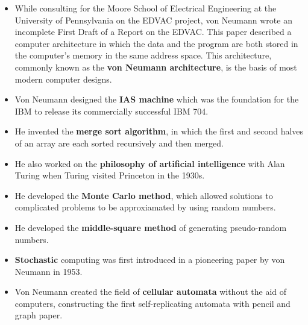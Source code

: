 \documentclass [12pt, a4paper]{article}
\begin{document}
\begin{itemize}

	\item While consulting for the Moore School of Electrical Engineering at the University of Pennsylvania on the EDVAC project, von Neumann wrote an incomplete First Draft of a Report on the EDVAC. This paper described a computer architecture in which the data and the program are both stored in the computer's memory in the same address space. This architecture, commonly known as the \textbf{von Neumann architecture}, is the basis of most modern computer designs.
	\item Von Neumann designed the \textbf{IAS machine} which was the foundation for the IBM to release its commercially successful IBM 704.
	\item He invented the \textbf{merge sort algorithm}, in which the first and second halves of an array are each sorted recursively and then merged.
	\item He also worked on the \textbf{philosophy of artificial intelligence} with Alan Turing when Turing visited Princeton in the 1930s.
	\item He developed the \textbf{Monte Carlo method}, which allowed solutions to complicated problems to be approxiamated by using random numbers.
	\item He developed the \textbf{middle-square method} of generating pseudo-random numbers.
	\item \textbf{Stochastic} computing was first introduced in a pioneering paper by von Neumann in 1953.
	\item Von Neumann created the field of \textbf{cellular automata} without the aid of computers, constructing the first self-replicating automata with pencil and graph paper.
	
\end{itemize}
\end{document}
